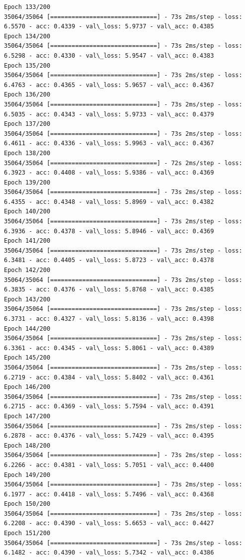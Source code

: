 \documentclass[11pt]{article}
\begin{document}
\begin{Verbatim}[commandchars=\\\{\}]
Epoch 133/200
35064/35064 [==============================] - 73s 2ms/step - loss: 6.5570 - acc: 0.4339 - val\_loss: 5.9737 - val\_acc: 0.4385
Epoch 134/200
35064/35064 [==============================] - 73s 2ms/step - loss: 6.5298 - acc: 0.4330 - val\_loss: 5.9547 - val\_acc: 0.4383
Epoch 135/200
35064/35064 [==============================] - 73s 2ms/step - loss: 6.4763 - acc: 0.4365 - val\_loss: 5.9657 - val\_acc: 0.4367
Epoch 136/200
35064/35064 [==============================] - 73s 2ms/step - loss: 6.5035 - acc: 0.4343 - val\_loss: 5.9733 - val\_acc: 0.4379
Epoch 137/200
35064/35064 [==============================] - 73s 2ms/step - loss: 6.4611 - acc: 0.4336 - val\_loss: 5.9963 - val\_acc: 0.4367
Epoch 138/200
35064/35064 [==============================] - 72s 2ms/step - loss: 6.3923 - acc: 0.4408 - val\_loss: 5.9386 - val\_acc: 0.4369
Epoch 139/200
35064/35064 [==============================] - 73s 2ms/step - loss: 6.4355 - acc: 0.4348 - val\_loss: 5.8969 - val\_acc: 0.4382
Epoch 140/200
35064/35064 [==============================] - 73s 2ms/step - loss: 6.3936 - acc: 0.4378 - val\_loss: 5.8946 - val\_acc: 0.4369
Epoch 141/200
35064/35064 [==============================] - 73s 2ms/step - loss: 6.3481 - acc: 0.4405 - val\_loss: 5.8723 - val\_acc: 0.4378
Epoch 142/200
35064/35064 [==============================] - 73s 2ms/step - loss: 6.3835 - acc: 0.4376 - val\_loss: 5.8768 - val\_acc: 0.4385
Epoch 143/200
35064/35064 [==============================] - 73s 2ms/step - loss: 6.3731 - acc: 0.4327 - val\_loss: 5.8136 - val\_acc: 0.4398
Epoch 144/200
35064/35064 [==============================] - 73s 2ms/step - loss: 6.3361 - acc: 0.4345 - val\_loss: 5.8061 - val\_acc: 0.4389
Epoch 145/200
35064/35064 [==============================] - 73s 2ms/step - loss: 6.2719 - acc: 0.4384 - val\_loss: 5.8402 - val\_acc: 0.4361
Epoch 146/200
35064/35064 [==============================] - 73s 2ms/step - loss: 6.2715 - acc: 0.4369 - val\_loss: 5.7594 - val\_acc: 0.4391
Epoch 147/200
35064/35064 [==============================] - 73s 2ms/step - loss: 6.2878 - acc: 0.4376 - val\_loss: 5.7429 - val\_acc: 0.4395
Epoch 148/200
35064/35064 [==============================] - 73s 2ms/step - loss: 6.2266 - acc: 0.4381 - val\_loss: 5.7051 - val\_acc: 0.4400
Epoch 149/200
35064/35064 [==============================] - 73s 2ms/step - loss: 6.1977 - acc: 0.4418 - val\_loss: 5.7496 - val\_acc: 0.4368
Epoch 150/200
35064/35064 [==============================] - 73s 2ms/step - loss: 6.2208 - acc: 0.4390 - val\_loss: 5.6653 - val\_acc: 0.4427
Epoch 151/200
35064/35064 [==============================] - 73s 2ms/step - loss: 6.1482 - acc: 0.4390 - val\_loss: 5.7342 - val\_acc: 0.4386

\end{Verbatim}
\end{document}
